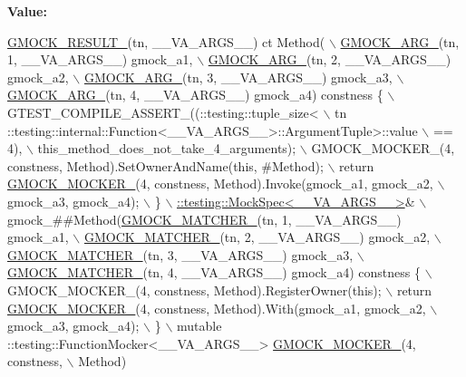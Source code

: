 {\bfseries Value\+:}
\begin{DoxyCode}
\hyperlink{gmock-generated-function-mockers_8h_a0e9d94e9c77df84f1103af06feee1077}{GMOCK\_RESULT\_}(tn, \_\_VA\_ARGS\_\_) ct Method( \(\backslash\)
      \hyperlink{gmock-generated-function-mockers_8h_a887575cc1c31158fba808180a10c004f}{GMOCK\_ARG\_}(tn, 1, \_\_VA\_ARGS\_\_) gmock\_a1, \(\backslash\)
      \hyperlink{gmock-generated-function-mockers_8h_a887575cc1c31158fba808180a10c004f}{GMOCK\_ARG\_}(tn, 2, \_\_VA\_ARGS\_\_) gmock\_a2, \(\backslash\)
      \hyperlink{gmock-generated-function-mockers_8h_a887575cc1c31158fba808180a10c004f}{GMOCK\_ARG\_}(tn, 3, \_\_VA\_ARGS\_\_) gmock\_a3, \(\backslash\)
      \hyperlink{gmock-generated-function-mockers_8h_a887575cc1c31158fba808180a10c004f}{GMOCK\_ARG\_}(tn, 4, \_\_VA\_ARGS\_\_) gmock\_a4) constness \{ \(\backslash\)
    GTEST\_COMPILE\_ASSERT\_((::testing::tuple\_size<                          \(\backslash\)
        tn ::testing::internal::Function<\_\_VA\_ARGS\_\_>::ArgumentTuple>::value \(\backslash\)
            == 4), \(\backslash\)
        this\_method\_does\_not\_take\_4\_arguments); \(\backslash\)
    GMOCK\_MOCKER\_(4, constness, Method).SetOwnerAndName(\textcolor{keyword}{this}, #Method); \(\backslash\)
    return \hyperlink{gmock-generated-function-mockers_8h_a7d362499e27b1bc3a9806dd3cf58a5b7}{GMOCK\_MOCKER\_}(4, constness, Method).Invoke(gmock\_a1, gmock\_a2, \(\backslash\)
        gmock\_a3, gmock\_a4); \(\backslash\)
  \} \(\backslash\)
  \hyperlink{classtesting_1_1internal_1_1MockSpec}{::testing::MockSpec<\_\_VA\_ARGS\_\_>}& \(\backslash\)
      gmock\_##Method(\hyperlink{gmock-generated-function-mockers_8h_aa87d0009fe91f1c89d658776b55a769c}{GMOCK\_MATCHER\_}(tn, 1, \_\_VA\_ARGS\_\_) gmock\_a1, \(\backslash\)
                     \hyperlink{gmock-generated-function-mockers_8h_aa87d0009fe91f1c89d658776b55a769c}{GMOCK\_MATCHER\_}(tn, 2, \_\_VA\_ARGS\_\_) gmock\_a2, \(\backslash\)
                     \hyperlink{gmock-generated-function-mockers_8h_aa87d0009fe91f1c89d658776b55a769c}{GMOCK\_MATCHER\_}(tn, 3, \_\_VA\_ARGS\_\_) gmock\_a3, \(\backslash\)
                     \hyperlink{gmock-generated-function-mockers_8h_aa87d0009fe91f1c89d658776b55a769c}{GMOCK\_MATCHER\_}(tn, 4, \_\_VA\_ARGS\_\_) gmock\_a4) constness \{ \(\backslash\)
    GMOCK\_MOCKER\_(4, constness, Method).RegisterOwner(\textcolor{keyword}{this}); \(\backslash\)
    return \hyperlink{gmock-generated-function-mockers_8h_a7d362499e27b1bc3a9806dd3cf58a5b7}{GMOCK\_MOCKER\_}(4, constness, Method).With(gmock\_a1, gmock\_a2, \(\backslash\)
        gmock\_a3, gmock\_a4); \(\backslash\)
  \} \(\backslash\)
  mutable ::testing::FunctionMocker<\_\_VA\_ARGS\_\_> \hyperlink{gmock-generated-function-mockers_8h_a7d362499e27b1bc3a9806dd3cf58a5b7}{GMOCK\_MOCKER\_}(4, constness, \(\backslash\)
      Method)
\end{DoxyCode}


